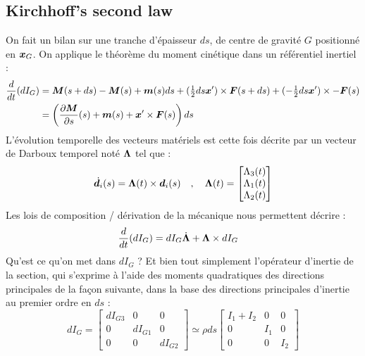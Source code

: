 \subsection{Kirchhoff's second law}
On fait un bilan sur une tranche d'épaisseur $ds$, de centre de gravité $G$ positionné en $\boldsymbol{x}_G$. On applique le théorème du moment cinétique dans un référentiel inertiel :
\begin{equation}
	\begin{aligned}
		\frac{d}{dt}(dI_G) &= 
		\boldsymbol{M}(s+ds)-\boldsymbol{M}(s) + \boldsymbol{m}(s)ds
		+ (\tfrac{1}{2}ds\boldsymbol{x}')\times \boldsymbol{F}(s+ds) + (-\tfrac{1}{2}ds\boldsymbol{x}')\times -\boldsymbol{F}(s)\\
		&= \left(\frac{\partial \boldsymbol{M}}{\partial s}(s)+\boldsymbol{m}(s) + \boldsymbol{x}'\times \boldsymbol{F}(s)\right)ds
	\end{aligned}
\end{equation}
L'évolution temporelle des vecteurs matériels est cette fois décrite par un vecteur de Darboux temporel noté $\boldsymbol{\Lambda}$ tel que :
\begin{equation}
	\dot{\boldsymbol{d}_{i}}(s) =\boldsymbol{\Lambda}(t) \times \boldsymbol{d}_i(s)	\quad,\quad
	\boldsymbol{\Lambda}(t)
	= 
	\begin{bmatrix}
		\Lambda_3(t) \\
		\Lambda_1(t) \\
		\Lambda_2(t)
	\end{bmatrix}
\end{equation}
Les lois de composition / dérivation de la mécanique nous permettent décrire :
\begin{equation}
	\begin{aligned}
		\frac{d}{dt}(dI_G) &= dI_G\dot{\boldsymbol{\Lambda}} + \boldsymbol{\Lambda}\times dI_G
	\end{aligned}
\end{equation}
Qu'est ce qu'on met dans $dI_G$ ? Et bien tout simplement l'opérateur d'inertie de la section, qui s'exprime à l'aide des moments quadratiques des directions principales de la façon suivante, dans la base des directions principales d'inertie au premier ordre en $ds$ :
\begin{equation}
	dI_G =
	 \begin{bmatrix}
			dI_{G3} & 0 & 0 \\
			0 & dI_{G1} & 0 \\
			0 & 0 & dI_{G2}
	\end{bmatrix}
	\simeq \rho ds
		\begin{bmatrix}
			I_1 + I_2 & 0 & 0 \\
			0 & I_1 & 0 \\
			0 & 0 & I_2
		\end{bmatrix}
\end{equation}

